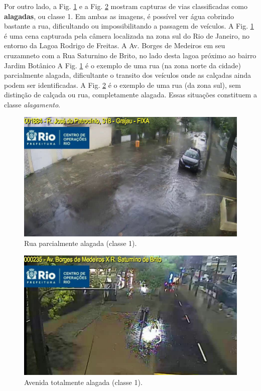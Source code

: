 Por outro lado, a Fig. \ref{fig:class1_1} e a Fig. \ref{fig:class1_2} mostram capturas de vias classificadas como \textbf{alagadas}, ou classe 1. 
Em ambas as imagens, é possível ver água cobrindo bastante a rua, dificultando ou impossibilitando a passagem de veículos. 
A Fig. \ref{fig:class1_1} é uma cena capturada pela câmera localizada na zona sul do Rio de Janeiro, no entorno da Lagoa Rodrigo de Freitas. 
A Av. Borges de Medeiros em seu cruzamneto com a Rua Saturnino de Brito, no lado desta lagoa próximo ao bairro Jardim Botânico
A Fig. \ref{fig:class1_1} é o exemplo de uma rua (na zona norte da cidade) parcialmente alagada, dificultante o transito dos veículos onde as calçadas ainda podem ser identificadas. A Fig. \ref{fig:class1_2} é o exemplo de uma rua (da zona sul), sem distinção de calçada ou rua, completamente alagada. Essas situações constituem a classe \textit{alagamento}. 

\begin{figure}[htb]
\centerline{\includegraphics[width=0.8\linewidth]{images/1/CODE1884 2023-08-20 12-56-29-9.jpg}}
\caption{Rua parcialmente alagada (classe 1).}
\label{fig:class1_1}
\end{figure}

\begin{figure}[htb]
\centerline{\includegraphics[width=0.8\linewidth]{images/1/CODE235 2023-02-07 20-11-08-9.jpg}}
\caption{Avenida totalmente alagada (classe 1).}
\label{fig:class1_2}
\end{figure}

